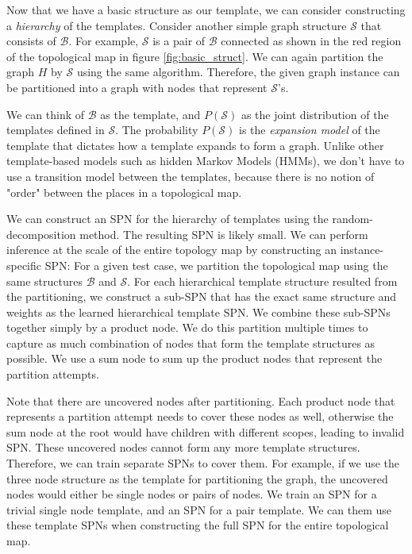 \documentclass[10pt, titlepage]{article}
\theoremstyle{definition}
\begin{document}
Now that we have a basic structure as our template, we can consider constructing a \textit{hierarchy} of the templates. Consider another simple graph structure $\mathcal{S}$ that consists of $\mathcal{B}$. For example, $\mathcal{S}$ is a pair of $\mathcal{B}$ connected as shown in the red region of the topological map in figure \ref{fig:basic_struct}. We can again partition the graph $H$ by $\mathcal{S}$ using the same algorithm. Therefore, the given graph instance can be partitioned into a graph with nodes that represent $\mathcal{S}$'s.

We can think of $\mathcal{B}$ as the template, and $P(\mathcal{S})$ as the joint distribution of the templates defined in $\mathcal{S}$. The probability $P(\mathcal{S})$ is the \textit{expansion model} of the template that dictates how a template expands to form a graph. Unlike other template-based models such as hidden Markov Models (HMMs), we don't have to use a transition model between the templates, because there is no notion of "order" between the places in a topological map.

We can construct an SPN for the hierarchy of templates using the random-decomposition method. The resulting SPN is likely small. We can perform inference at the scale of the entire topology map by constructing an instance-specific SPN: For a given test case, we partition the topological map using the same structures $\mathcal{B}$ and $\mathcal{S}$. For each hierarchical template structure resulted from the partitioning, we construct a sub-SPN that has the exact same structure and weights as the learned hierarchical template SPN. We combine these sub-SPNs together simply by a product node.  We do this partition multiple times to capture as much combination of nodes that form the template structures as possible. We use a sum node to sum up the product nodes that represent the partition attempts.

Note that there are uncovered nodes after partitioning. Each product node that represents a partition attempt needs to cover these nodes as well, otherwise the sum node at the root would have children with different scopes, leading to invalid SPN. These uncovered nodes cannot form any more template structures. 
Therefore, we can train separate SPNs to cover them. For example, if we use the three node structure as the template for partitioning the graph, the uncovered nodes would either be single nodes or pairs of nodes. We train an SPN for a trivial single node template, and an SPN for a pair template. We can them use these template SPNs when constructing the full SPN for the entire topological map. 
\end{document}
